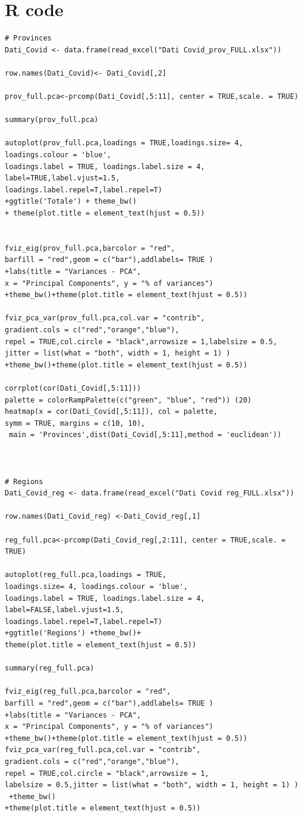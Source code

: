 \documentclass[
12pt, %
a4paper, %
oneside, %
headinclude,footinclude, %
BCOR5mm, %
]{scrartcl}
\begin{document}
\section{R code}
\begin{lstlisting}
# Provinces
Dati_Covid <- data.frame(read_excel("Dati Covid_prov_FULL.xlsx"))

row.names(Dati_Covid)<- Dati_Covid[,2]

prov_full.pca<-prcomp(Dati_Covid[,5:11], center = TRUE,scale. = TRUE)

summary(prov_full.pca)

autoplot(prov_full.pca,loadings = TRUE,loadings.size= 4,
loadings.colour = 'blue',
loadings.label = TRUE, loadings.label.size = 4,
label=TRUE,label.vjust=1.5,
loadings.label.repel=T,label.repel=T)
+ggtitle('Totale') + theme_bw()
+ theme(plot.title = element_text(hjust = 0.5))


fviz_eig(prov_full.pca,barcolor = "red",
barfill = "red",geom = c("bar"),addlabels= TRUE )
+labs(title = "Variances - PCA",
x = "Principal Components", y = "% of variances")
+theme_bw()+theme(plot.title = element_text(hjust = 0.5))

fviz_pca_var(prov_full.pca,col.var = "contrib",
gradient.cols = c("red","orange","blue"),
repel = TRUE,col.circle = "black",arrowsize = 1,labelsize = 0.5,
jitter = list(what = "both", width = 1, height = 1) ) 
+theme_bw()+theme(plot.title = element_text(hjust = 0.5)) 

corrplot(cor(Dati_Covid[,5:11]))
palette = colorRampPalette(c("green", "blue", "red")) (20)
heatmap(x = cor(Dati_Covid[,5:11]), col = palette, 
symm = TRUE, margins = c(10, 10),
 main = 'Provinces',dist(Dati_Covid[,5:11],method = 'euclidean'))



# Regions
Dati_Covid_reg <- data.frame(read_excel("Dati Covid reg_FULL.xlsx"))

row.names(Dati_Covid_reg) <-Dati_Covid_reg[,1]

reg_full.pca<-prcomp(Dati_Covid_reg[,2:11], center = TRUE,scale. = TRUE)

autoplot(reg_full.pca,loadings = TRUE,
loadings.size= 4, loadings.colour = 'blue',
loadings.label = TRUE, loadings.label.size = 4,
label=FALSE,label.vjust=1.5,
loadings.label.repel=T,label.repel=T)
+ggtitle('Regions') +theme_bw()+
theme(plot.title = element_text(hjust = 0.5))

summary(reg_full.pca)

fviz_eig(reg_full.pca,barcolor = "red",
barfill = "red",geom = c("bar"),addlabels= TRUE )
+labs(title = "Variances - PCA",
x = "Principal Components", y = "% of variances")
+theme_bw()+theme(plot.title = element_text(hjust = 0.5))
fviz_pca_var(reg_full.pca,col.var = "contrib",
gradient.cols = c("red","orange","blue"),
repel = TRUE,col.circle = "black",arrowsize = 1,
labelsize = 0.5,jitter = list(what = "both", width = 1, height = 1) )
 +theme_bw()
+theme(plot.title = element_text(hjust = 0.5))


\end{lstlisting}
\end{document}
